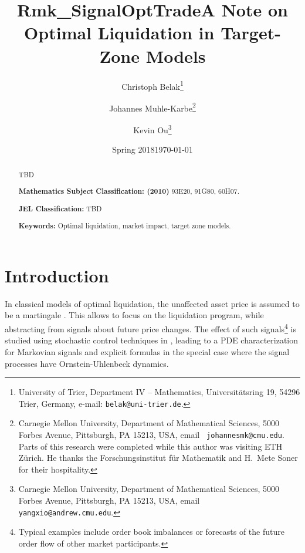 \documentclass[11pt]{article}
\title{Rmk_SignalOptTrade}
\date{Spring 2018}
\theoremstyle{definition}
\theoremstyle{remark}
\begin{document}
\title{A Note on Optimal Liquidation in Target-Zone Models}

\author{
Christoph Belak\thanks{University of Trier, Department IV -- Mathematics, Universit\"atsring 19, 54296 Trier, Germany, e-mail: \texttt{belak@uni-trier.de}.}
\and
Johannes Muhle-Karbe\thanks{Carnegie Mellon University, Department of Mathematical Sciences, 5000 Forbes Avenue, Pittsburgh, PA 15213, USA, email \texttt{ johannesmk@cmu.edu}. Parts of this research were completed while this author was visiting ETH Z\"urich. He thanks the Forschungsinstitut f\"ur Mathematik and H.~Mete Soner for their hospitality. }
\and
Kevin Ou\thanks{Carnegie Mellon University, Department of Mathematical Sciences, 5000 Forbes Avenue, Pittsburgh, PA 15213, USA, email \texttt{ yangxio@andrew.cmu.edu}.}
}

\date{\today}

\maketitle

\begin{abstract}
TBD

\bigskip
\noindent\textbf{Mathematics Subject Classification: (2010)} 93E20, 91G80, 60H07.

\bigskip
\noindent\textbf{JEL Classification:} TBD

\bigskip
\noindent\textbf{Keywords:} Optimal liquidation, market impact, target zone models.

\end{abstract}




\section{Introduction}

In classical models of optimal liquidation, the unaffected asset price is assumed to be a martingale \cite{bertsimas.lo.98,almgren2001optimal,obizhaeva.wang.13,alfonsi.al.10,predoiu.al.11}. This allows to focus on the liquidation program, while abstracting from signals about future price changes. The effect of such signals\footnote{Typical examples include order book imbalances or forecasts of the future order flow of other market participants.} is studied using stochastic control techniques in \cite{cartea.jaimungal.16,lehalle2017incorporating}, leading to a PDE characterization for Markovian signals and explicit formulas in the special case where the signal processes have Ornstein-Uhlenbeck dynamics. 
\end{document}
